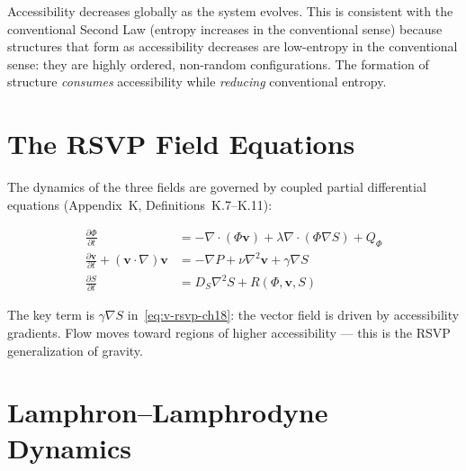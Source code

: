 Accessibility decreases globally as the system evolves. This is consistent
with the conventional Second Law (entropy increases in the conventional sense)
because structures that form as accessibility decreases are low-entropy
in the conventional sense: they are highly ordered, non-random configurations.
The formation of structure \emph{consumes} accessibility while \emph{reducing}
conventional entropy.

\section{The RSVP Field Equations}

The dynamics of the three fields are governed by coupled partial differential
equations (Appendix~K, Definitions~K.7–K.11):

\begin{align}
  \frac{\partial \Phi}{\partial t} &= -\nabla \cdot (\Phi \mathbf{v})
    + \lambda \nabla \cdot (\Phi \nabla S) + Q_\Phi
    \label{eq:phi-rsvp-ch18} \\
  \frac{\partial \mathbf{v}}{\partial t} + (\mathbf{v} \cdot \nabla)\mathbf{v}
  &= -\nabla P + \nu \nabla^2 \mathbf{v} + \gamma \nabla S
    \label{eq:v-rsvp-ch18} \\
  \frac{\partial S}{\partial t} &= D_S \nabla^2 S
    + R(\Phi, \mathbf{v}, S)
    \label{eq:s-rsvp-ch18}
\end{align}

The key term is $\gamma \nabla S$ in~\eqref{eq:v-rsvp-ch18}: the vector
field is driven by accessibility gradients. Flow moves toward regions of
higher accessibility — this is the RSVP generalization of gravity.

\section{Lamphron–Lamphrodyne Dynamics}

